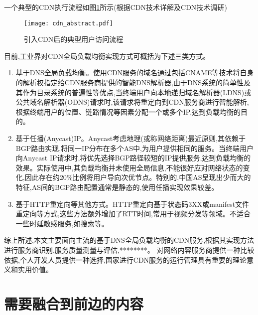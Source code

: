 \FloatBarrier

一个典型的CDN执行流程如图\ref{fig:join_cdn_classic}所示(根据CDN技术详解\cite{leibaohua-CDN-2012}及CDN技术调研\cite{Pathan-survey-2007})


\begin{figure}[h]
	\centering
	\texttt{[image: cdn\_abstract.pdf]}
	\caption{引入CDN后的典型用户访问流程}
	\label{fig:join_cdn_classic}
\end{figure}

\FloatBarrier


目前,工业界对CDN全局负载均衡实现方式可概括为下述三类方式。


\begin{enumerate}[label={(\arabic*)}]
	\item 基于DNS全局负载均衡。使用CDN服务的域名通过包括CNAME等技术\cite{Choffnes2017}将自身的解析权指定给CDN服务商提供的智能DNS解析器,由于DNS系统的简单性及其作为目录系统的普遍性\cite{Pathan-survey-2007}等优点,当终端用户向本地递归域名解析器(LDNS)或公共域名解析器(ODNS)请求时,该请求将重定向到CDN服务商进行智能解析,根据终端用户的位置、链路情况等因素分配一个或多个IP,达到负载均衡的目的。
	\item 基于任播(Anycast)IP。Anycast考虑地理(或称网络距离)最近原则,其依赖于BGP路由实现,将同一IP分布在多个AS中,为用户提供相同的服务。当终端用户向Anycast IP请求时,将优先选择BGP路径较短的IP提供服务,达到负载均衡的效果。实际使用中,其负载均衡并未使用全局信息\cite{Calder2015},不能很好应对网络状态的变化\cite{Choffnes2017},因此存在约20\%比例将用户导向次优节点。特别的,中国AS呈现出少而大的特征,AS间的BGP路由配置通常是静态的\cite{Choffnes2017},使用任播实现效果较差。
	\item 基于HTTP重定向等其他方式。HTTP重定向基于状态码3XX或manifest文件重定向\cite{Adhikari2014}等方式,这些方法额外增加了RTT时间,常用于视频分发等领域。不适合一些时延敏感服务,如搜索等。
\end{enumerate}

综上所述,本文主要面向主流\cite{Hao2018}的基于DNS全局负载均衡的CDN服务,根据其实现方法进行服务商识别,服务质量测量与评估,********。
对网络内容服务商提供一种比较依据,个人开发人员提供一种选择,国家进行CDN服务的运行管理具有重要的理论意义和实用价值。
 


\section{需要融合到前边的内容}  

